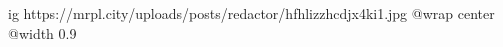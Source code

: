  
 
 
 
 

\ifcmt
  ig https://mrpl.city/uploads/posts/redactor/hfhlizzhcdjx4ki1.jpg
  @wrap center
  @width 0.9
\fi
